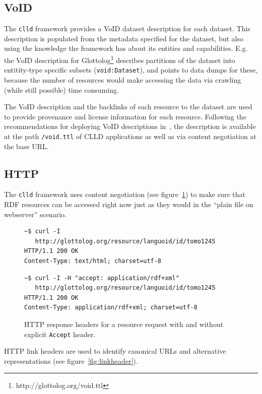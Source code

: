 \documentclass[a4paper,10pt]{article}
\begin{document}
\subsection{VoID} 
\label{sec:void}
The \texttt{clld} framework provides a VoID dataset description for each dataset. This description is populated from
the metadata specified for the dataset, but also using the knowledge the framework has about its entities and capabilities.
E.g. the VoID description for Glottolog\footnote{http://glottolog.org/void.ttl} describes partitions of the dataset into entitity-type specific subsets (\texttt{void:Dataset}),
and points to data dumps for these, because the number of resources would make accessing the data via crawling (while still possible) 
time consuming.

The VoID description and the backlinks of each resource to the dataset are used to provide provenance and license information for each resource.
Following the recommendations for deploying VoID descriptions in~\cite{void}, the description is available at the path \texttt{/void.ttl} of CLLD applications as well as via content negotiation at the base URL.


\subsection{HTTP}
The \texttt{clld} framework uses content negotiation (see figure~\ref{fig:conneg})
to make sure that RDF resources can be accessed right now just as they would in the ``plain file on webserver'' scenario.
\begin{figure}
\label{fig:conneg}
\caption{HTTP response headers for a resource request with and without explicit \texttt{Accept} header.}
{\scriptsize
\begin{verbatim}
~$ curl -I 
   http://glottolog.org/resource/languoid/id/tomo1245
HTTP/1.1 200 OK
Content-Type: text/html; charset=utf-8
\end{verbatim}
}

{\scriptsize
\begin{verbatim}
~$ curl -I -H "accept: application/rdf+xml" 
   http://glottolog.org/resource/languoid/id/tomo1245
HTTP/1.1 200 OK
Content-Type: application/rdf+xml; charset=utf-8
\end{verbatim}
}
\end{figure}
HTTP link headers are used to identify canonical URLs and alternative representations (see figure~\ref{fig:linkheader}).
\end{document}
